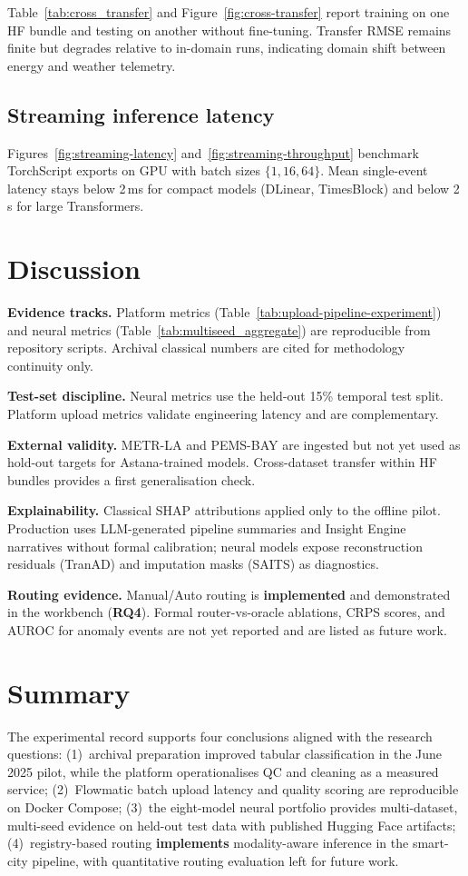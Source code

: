 Table~\ref{tab:cross_transfer} and Figure~\ref{fig:cross-transfer} report training on one HF bundle and testing on another without fine-tuning. Transfer RMSE remains finite but degrades relative to in-domain runs, indicating domain shift between energy and weather telemetry.

\subsection{Streaming inference latency}

Figures~\ref{fig:streaming-latency} and~\ref{fig:streaming-throughput} benchmark TorchScript exports on GPU with batch sizes $\{1,16,64\}$. Mean single-event latency stays below 2\,ms for compact models (DLinear, TimesBlock) and below 2\,s for large Transformers.

\section{Discussion}
\label{sec:discussion}

\textbf{Evidence tracks.} Platform metrics (Table~\ref{tab:upload-pipeline-experiment}) and neural metrics (Table~\ref{tab:multiseed_aggregate}) are reproducible from repository scripts. Archival classical numbers are cited for methodology continuity only.

\textbf{Test-set discipline.} Neural metrics use the held-out 15\% temporal test split. Platform upload metrics validate engineering latency and are complementary.

\textbf{External validity.} METR-LA and PEMS-BAY are ingested but not yet used as hold-out targets for Astana-trained models. Cross-dataset transfer within HF bundles provides a first generalisation check.

\textbf{Explainability.} Classical SHAP attributions applied only to the offline pilot. Production uses LLM-generated pipeline summaries and Insight Engine narratives without formal calibration; neural models expose reconstruction residuals (TranAD) and imputation masks (SAITS) as diagnostics.

\textbf{Routing evidence.} Manual/Auto routing is \textbf{implemented} and demonstrated in the workbench (\textbf{RQ4}). Formal router-vs-oracle ablations, CRPS scores, and AUROC for anomaly events are not yet reported and are listed as future work.

\section{Summary}

The experimental record supports four conclusions aligned with the research questions: (1)~archival preparation improved tabular classification in the June 2025 pilot, while the platform operationalises QC and cleaning as a measured service; (2)~Flowmatic batch upload latency and quality scoring are reproducible on Docker Compose; (3)~the eight-model neural portfolio provides multi-dataset, multi-seed evidence on held-out test data with published Hugging Face artifacts; (4)~registry-based routing \textbf{implements} modality-aware inference in the smart-city pipeline, with quantitative routing evaluation left for future work.
